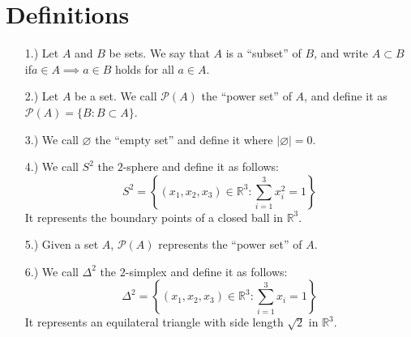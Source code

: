 \documentclass[11pt]{article}
\newcommand{\vertb}[1]{\left\vert#1\right\vert}
\newcommand{\braces}[1]{\left\{#1\right\}}
\begin{document}
\pagestyle{fancy}
\fancyhead{}

\normalsize

\section*{Definitions}
\begin{itemize}
    \item [1.)] Let $A$ and $B$ be sets. We say that $A$ is a ``subset'' of $B$, and write $A\subset B$ if\break$a\in A\implies a\in B$ holds for all $a\in A$.

    \item [2.)] Let $A$ be a set. We call $\mathcal{P}(A)$ the ``power set'' of $A$, and define it as $\mathcal{P}(A)=\{B:B\subset A\}$.

    \item [3.)] We call $\varnothing$ the ``empty set'' and define it where $\vertb{\varnothing}=0$.

    \item [4.)] We call $S^2$ the $2$-sphere and define it as follows:
    \[S^2=\braces{(x_1,x_2,x_3)\in\mathbb{R}^3:\sum_{i=1}^3x_i^2=1}\]
    It represents the boundary points of a closed ball in $\mathbb{R}^3$.

    \item [5.)] Given a set $A$, $\mathcal{P}(A)$ represents the ``power set'' of $A$.

    \item [6.)] We call $\Delta^2$ the $2$-simplex and define it as follows:
    \[\Delta^2=\braces{(x_1,x_2,x_3)\in\mathbb{R}^3:\sum_{i=1}^3x_i=1}\]
    It represents an equilateral triangle with side length $\sqrt{2}$ in $\mathbb{R}^3$.
\end{itemize}
\end{document}
